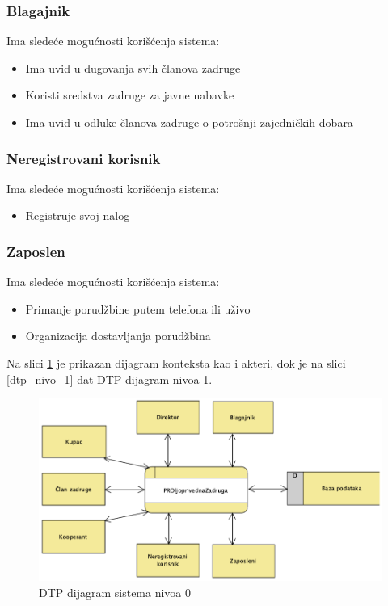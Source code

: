 \documentclass[a4paper, oneside]{article}
\begin{document}
\subsubsection{Blagajnik}
\indent Ima sledeće mogućnosti korišćenja sistema:
\begin{itemize}
    \item Ima uvid u dugovanja svih članova zadruge
    \item Koristi sredstva zadruge za javne nabavke
    \item Ima uvid u odluke članova zadruge o potrošnji zajedničkih dobara
\end{itemize}

\subsubsection{Neregistrovani korisnik}
\indent Ima sledeće mogućnosti korišćenja sistema:
\begin{itemize}
    \item Registruje svoj nalog
\end{itemize}

\subsubsection{Zaposlen}
\indent Ima sledeće mogućnosti korišćenja sistema:
\begin{itemize}
    \item Primanje porudžbine putem telefona ili uživo
    \item Organizacija dostavljanja porudžbina
\end{itemize}

\newpage

Na slici \ref{dtp_nivo_0} je prikazan dijagram konteksta kao i akteri, dok je na slici \ref{dtp_nivo_1} dat DTP dijagram nivoa 1.
\begin{figure}[h!]
    \centering
    \includegraphics[scale=0.72]{images/dtp_nivo_0.png}
    \caption{DTP dijagram sistema nivoa 0}
    \label{dtp_nivo_0}
\end{figure}
\end{document}

